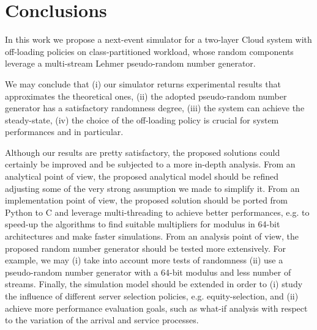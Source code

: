 \section{Conclusions}
\label{sec:conclusions}

In this work we propose a next-event simulator for a two-layer Cloud system with off-loading policies on class-partitioned workload, whose random components leverage a multi-stream Lehmer pseudo-random number generator.

We may conclude that 
(i) our simulator returns experimental results that approximates the theoretical ones, 
(ii) the adopted pseudo-random number generator has a satisfactory randomness degree,
(iii) the system can achieve the steady-state,
(iv) the choice of the off-loading policy is crucial for system performances and in particular.

Although our results are pretty satisfactory, the proposed solutions could certainly be improved and be subjected to a more in-depth analysis.
%
From an analytical point of view, the proposed analytical model should be refined adjusting some of the very strong assumption we made to simplify it.
%
From an implementation point of view, the proposed solution should be ported from Python to C and leverage multi-threading to achieve better performances, e.g. to speed-up the algorithms to find suitable multipliers for modulus in 64-bit architectures and make faster simulations.
%
From an analysis point of view, the proposed random number generator should be tested more extensively. For example, we may (i) take into account more tests of randomness (ii) use a pseudo-random number generator with a 64-bit modulus and less number of streams.
%
Finally, the simulation model should be extended in order to 
(i) study the influence of different server selection policies, e.g. equity-selection, and 
(ii) achieve more performance evaluation goals, such as what-if analysis with respect to the variation of the arrival and service processes.
